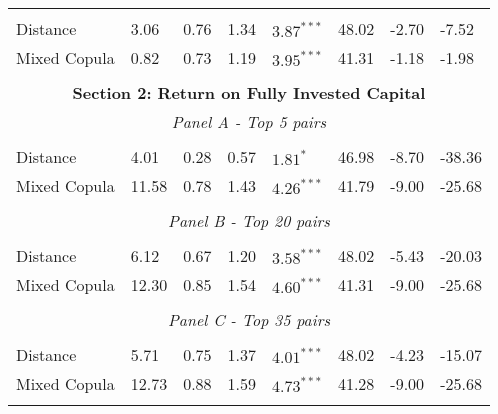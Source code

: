 \documentclass[a4paper]{article}
\begin{document}
\begin{threeparttable}[H]
\begin{tabularx}{\textwidth}{@{\extracolsep{\fill}}llllllll@{}}
		&       &       &       &       &       &       &  \\
		Distance &  3.06  &  0.76  & 1.34  & $3.87^{***}$  & 48.02 & -2.70  & -7.52 \\
		Mixed Copula & 0.82  & 0.73  & 1.19  & $3.95^{***}$  & 41.31 &  -1.18  &  -1.98  \\
		\multicolumn{1}{r}{} & \multicolumn{1}{r}{} & \multicolumn{1}{r}{} & \multicolumn{1}{r}{} & \multicolumn{1}{r}{} & \multicolumn{1}{r}{} & \multicolumn{1}{r}{} & \multicolumn{1}{r}{} \\
		\midrule
		\multicolumn{8}{c}{\textbf{Section 2: Return on Fully Invested Capital}} \\
		\multicolumn{8}{c}{\textit{Panel A - Top 5 pairs}} \\
		&       &       &       &       &       &       &  \\
		Distance & 4.01  & 0.28  & 0.57  & $1.81^{*}$  & 46.98 & -8.70    & -38.36  \\
		Mixed Copula & 11.58  & 0.78  & 1.43  & $4.26^{***}$  & 41.79 & -9.00  & -25.68 \\
		\multicolumn{1}{r}{} & \multicolumn{1}{r}{} & \multicolumn{1}{r}{} & \multicolumn{1}{r}{} & \multicolumn{1}{r}{} & \multicolumn{1}{r}{} & \multicolumn{1}{r}{} & \multicolumn{1}{r}{} \\
		\multicolumn{8}{c}{\textit{Panel B - Top 20 pairs}} \\
		&       &       &       &       &       &       &  \\
		Distance & 6.12  & 0.67  & 1.20  & $3.58^{***}$  & 48.02 & -5.43  & -20.03 \\
		Mixed Copula  & 12.30  & 0.85  & 1.54  & $4.60^{***}$  & 41.31 & -9.00  & -25.68  \\
		\multicolumn{1}{r}{} & \multicolumn{1}{r}{} & \multicolumn{1}{r}{} & \multicolumn{1}{r}{} & \multicolumn{1}{r}{} & \multicolumn{1}{r}{} & \multicolumn{1}{r}{} & \multicolumn{1}{r}{} \\
		\multicolumn{8}{c}{\textit{Panel C - Top 35 pairs}} \\
		&       &       &       &       &       &       &  \\
		Distance & 5.71  & 0.75  & 1.37  & $4.01^{***}$  & 48.02 & -4.23  & -15.07 \\
		Mixed Copula & 12.73  & 0.88  & 1.59  & $4.73^{***}$  & 41.28 & -9.00  & -25.68  \\
		\multicolumn{1}{r}{} & \multicolumn{1}{r}{} & \multicolumn{1}{r}{} & \multicolumn{1}{r}{} & \multicolumn{1}{r}{} & \multicolumn{1}{r}{} & \multicolumn{1}{r}{} & \multicolumn{1}{r}{} \\

\end{tabularx}
\end{threeparttable}
\end{document}
